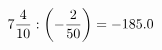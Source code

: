 \documentclass[preview]{standalone}
\begin{document}
\begin{align*}
7 { 4 \over 10 }  :  \left( - { 2 \over 50 } \right) = -185.0
\end{align*}
\end{document}
